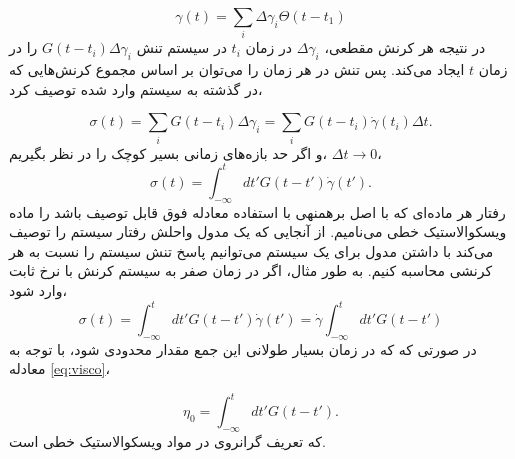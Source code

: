 \begin{equation}
\gamma(t)=\sum_i\Delta\gamma_i\Theta(t-t_1)
\end{equation}
در نتیجه هر کرنش مقطعی، $\Delta\gamma_i$ در زمان $t_i$ در سیستم تنش $G(t-t_i)\Delta\gamma_i$ را در زمان $t$ ایجاد می‌کند. پس تنش در هر زمان را می‌توان بر اساس مجموع کرنش‌هایی که در گذشته به سیستم وارد شده توصیف کرد،

\begin{equation}
\sigma(t)=\sum_iG(t-t_i)\Delta\gamma_i=\sum_iG(t-t_i)\dot\gamma(t_i)\Delta t.
\end{equation}
و اگر حد بازه‌های زمانی بسیر کوچک را در نظر بگیریم،‌ $\Delta t\rightarrow0$، 
\begin{equation}
\sigma(t)=\int_{-\infty}^tdt'G(t-t')\dot\gamma(t').
\label{eq:sigma}
\end{equation}
رفتار هر ماده‌ای که با اصل برهمنهی با استفاده معادله فوق قابل توصیف باشد را ماده ویسکوالاستیک خطی می‌نامیم. از آنجایی که یک مدول واحلش رفتار سیستم را توصیف می‌کند با داشتن مدول برای یک سیستم می‌توانیم پاسخ تنش سیستم را نسبت به هر کرنشی محاسبه کنیم. به طور مثال، اگر در زمان صفر به سیستم کرنش با نرخ ثابت وارد شود، 
\begin{equation}
\sigma(t)=\int_{-\infty}^tdt'G(t-t')\dot\gamma(t')=\dot\gamma\int_{-\infty}^tdt'G(t-t')
\end{equation}
در صورتی که که در زمان بسیار طولانی این جمع مقدار محدودی شود، با توجه به معادله \ref{eq:visco}،

\begin{equation}
\eta_0=\int_{-\infty}^tdt'G(t-t').
\end{equation}
که تعریف گرانروی در مواد ویسکوالاستیک خطی‌ است.


